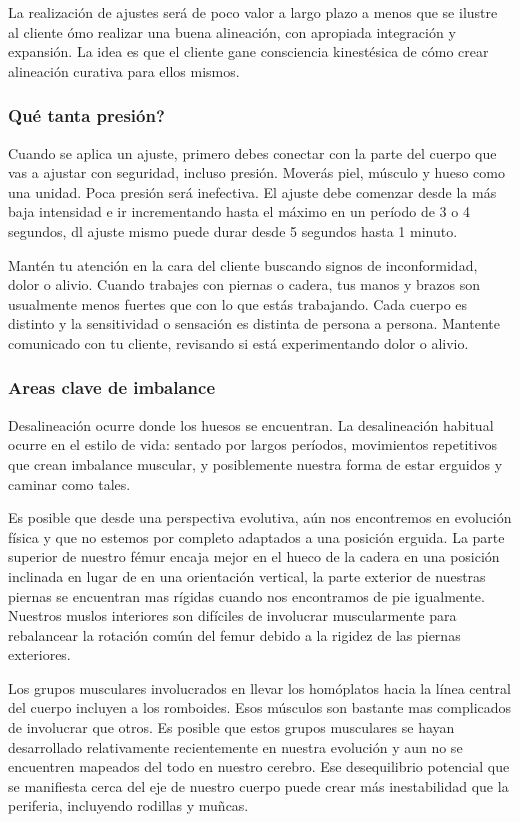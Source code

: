 La realización de ajustes será de poco valor a largo plazo a menos que se ilustre al cliente ómo realizar una buena alineación, con apropiada integración y expansión. La idea es que el cliente gane consciencia kinestésica de cómo crear alineación curativa para ellos mismos.

\subsubsection{Qué tanta presión?}
Cuando se aplica un ajuste, primero debes conectar con la parte del cuerpo que vas a ajustar con seguridad, incluso presión. Moverás piel, músculo y hueso como una unidad. Poca presión será inefectiva. El ajuste debe comenzar desde la más baja intensidad e ir incrementando hasta el máximo en un período de 3 o 4 segundos, dl ajuste mismo puede durar desde 5 segundos hasta 1 minuto.

Mantén tu atención en la cara del cliente buscando signos de inconformidad, dolor o alivio. Cuando trabajes con piernas o cadera, tus manos y brazos son usualmente menos fuertes que con lo que estás trabajando. Cada cuerpo es distinto y la sensitividad o sensación es distinta de persona a persona. Mantente comunicado con tu cliente, revisando si está experimentando dolor o alivio.

\subsubsection{Areas clave de imbalance}

Desalineación ocurre donde los huesos se encuentran. La desalineación habitual ocurre en el estilo de vida: sentado por largos períodos, movimientos repetitivos que crean imbalance muscular, y posiblemente nuestra forma de estar erguidos y caminar como tales.

Es posible que desde una perspectiva evolutiva, aún nos encontremos en evolución física y que no estemos por completo adaptados a una posición erguida. La parte superior de nuestro fémur encaja mejor en el hueco de la cadera en una posición inclinada en lugar de en una orientación vertical, la parte exterior de nuestras piernas se encuentran mas rígidas cuando nos encontramos de pie igualmente. Nuestros muslos interiores son difíciles de involucrar muscularmente para rebalancear la rotación común del femur debido a la rigidez de las piernas exteriores.

Los grupos musculares involucrados en llevar los homóplatos hacia la línea central del cuerpo incluyen a los romboides. Esos músculos son bastante mas complicados de involucrar que otros. Es posible que estos grupos musculares se hayan desarrollado relativamente recientemente en nuestra evolución y aun no se encuentren mapeados del todo en nuestro cerebro. Ese desequilibrio potencial que se manifiesta cerca del eje de nuestro cuerpo puede crear más inestabilidad que la periferia, incluyendo rodillas y muñcas.

